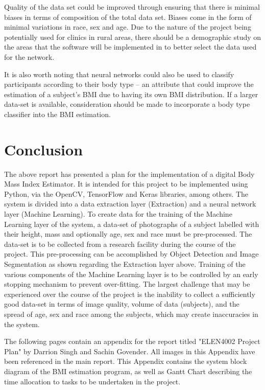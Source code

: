 Quality of the data set could be improved through ensuring that there is minimal biases in terms of composition of the total data set.
Biases come in the form of minimal variations in race, sex and age.
Due to the nature of the project being potentially used for clinics in rural areas, there should be a demographic study on the areas that the
software will be implemented in to better select the data used for the network.

It is also worth noting that neural networks could also be used to classify participants according to their body type -- an attribute that could improve the estimation of a subject's BMI due to having its own BMI distribution. 
If a larger data-set is available, consideration should be made to incorporate a body type classifier into the BMI estimation.

\section{Conclusion}
The above report has presented a plan for the implementation of a digital Body Mass Index Estimator.
It is intended for this project to be implemented using Python, via the OpenCV, TensorFlow and Keras libraries, among others.
The system is divided into a data extraction layer (Extraction) and a neural network layer (Machine Learning).
To create data for the training of the Machine Learning layer of the system, a data-set of photographs of a subject labelled with their height, mass and optionally age, sex and race must be pre-processed.
The data-set is to be collected from a research facility during the course of the project.
This pre-processing can be accomplished by Object Detection and Image Segmentation as shown regarding the Extraction layer above.
Training of the various components of the Machine Learning layer is to be controlled by an early stopping mechanism to prevent over-fitting.
The largest challenge that may be experienced over the course of the project is the inability to collect a sufficiently good data-set in terms of image quality, volume of data (subjects), and the spread of age, sex and race among the subjects, which may create inaccuracies in the system.


\appendix
The following pages contain an appendix for the report titled "ELEN4002 Project Plan" by Darrion Singh and Sachin Govender.
All images in this Appendix have been referenced in the main report.
This Appendix contains the system block diagram of the BMI estimation program, as well as Gantt Chart describing the time allocation to tasks to be undertaken in the project.

